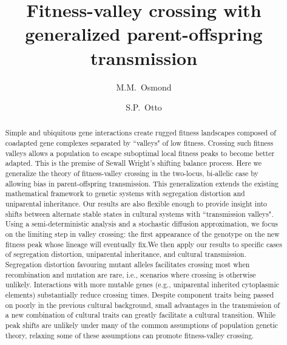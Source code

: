 \documentclass[review,3p,authoryear]{elsarticle}
\begin{document}
\linenumbers

\title{Fitness-valley crossing with generalized parent-offspring transmission}
\author[ubc]{M.M.~Osmond}
\author[ubc]{S.P.~Otto}
\address[ubc]{Department of Zoology, University of British Columbia, Vancouver, British Columbia V6T 1Z4, Canada}

\begin{abstract}
Simple and ubiquitous gene interactions create rugged fitness landscapes composed of coadapted gene complexes separated by ``valleys" of low fitness.
Crossing such fitness valleys allows a population to escape suboptimal local fitness peaks to become better adapted.
This is the premise of Sewall Wright's shifting balance process.
Here we generalize the theory of fitness-valley crossing in the two-locus, bi-allelic case by allowing bias in parent-offspring transmission.
This generalization extends the existing mathematical framework to genetic systems with segregation distortion and uniparental inheritance.
Our results are also flexible enough to provide insight into shifts between alternate stable states in cultural systems with ``transmission valleys". 
Using a semi-deterministic analysis and a stochastic diffusion approximation, we focus on the limiting step in valley crossing: the first appearance of the genotype on the new fitness peak whose lineage will eventually fix.We then apply our results to specific cases of segregation distortion, uniparental inheritance, and cultural transmission.
Segregation distortion favouring mutant alleles facilitates crossing most when recombination and mutation are rare, i.e., scenarios where crossing is otherwise unlikely. 
Interactions with more mutable genes (e.g., uniparental inherited cytoplasmic elements) substantially reduce crossing times. 
Despite component traits being passed on poorly in the previous cultural background, small advantages in the transmission of a  new combination of cultural traits can greatly facilitate a cultural transition.
While peak shifts are unlikely under many of the common assumptions of population genetic theory, relaxing some of these assumptions can promote fitness-valley crossing.
\end{abstract}
\end{document}
